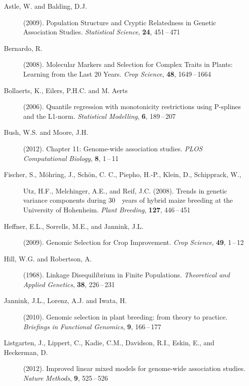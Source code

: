 \documentclass[twoside]{report}
\begin{document}
\begin{description}
\item[Astle, W. and Balding, D.J.] (2009).
		Population Structure and Cryptic Relatedness in Genetic Association Studies.
		{\it Statistical Science}, {\bf 24}, 451\,--\,471
\item[Bernardo, R.] (2008). 
		Molecular Markers and Selection for Complex Traits in Plants: Learning from the Last 20 Years.
		{\it Crop Science}, {\bf 48}, 1649\,--\,1664
		
\item[Bollaerts, K., Eilers, P.H.C. and M. Aerts] (2006). Quantile regression with monotonicity restrictions using P-splines and the L1-norm. {\it Statistical Modelling}, {\bf 6}, 189\,--\,207 
\item[Bush, W.S. and Moore, J.H.] (2012).
		Chapter 11: Genome-wide association studies.
		{\it PLOS Computational Biology}, {\bf 8}, 1\,--\,11
\item[Fischer, S., M\"{o}hring, J., Sch\"{o}n, C. C., Piepho, H.-P., Klein, D., Schipprack, W.,] {Utz, H.F., Melchinger, A.E., and Reif, J.C.} (2008).
		Trends in genetic variance components during 30 years of hybrid maize breeding at the University of Hohenheim.
		{\it Plant Breeding}, {\bf 127}, 446\,--\,451
\item[Heffner, E.L., Sorrells, M.E., and Jannink, J.L.] (2009).
		Genomic Selection for Crop Improvement. 
		{\it Crop Science}, {\bf 49}, 1\,--\,12
\item[Hill, W.G. and Robertson, A.] (1968).
		Linkage Disequilibrium in Finite Populations.
		{\it Theoretical and Applied Genetics}, {\bf 38}, 226\,--\,231		
\item[Jannink, J.L., Lorenz, A.J. and Iwata, H.] (2010).
		Genomic selection in plant breeding: from theory to practice.
		{\it Briefings in Functional Genomics}, {\bf 9}, 166\,--\,177
\item[Listgarten, J., Lippert, C., Kadie, C.M., Davidson, R.I., Eskin, E., and Heckerman, D.] (2012). 
		Improved linear mixed models for genome-wide association studies.
		{\it Nature Methods}, {\bf 9}, 525\,--\,526
		

\end{description}
\end{document}
